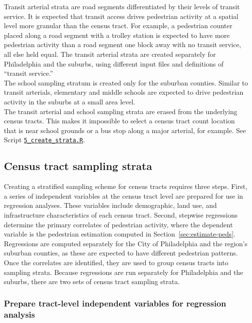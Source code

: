 \documentclass[paper=letterpaper, fontsize=11pt]{scrartcl}
\begin{document}
Transit arterial strata are road segments differentiated by their levels of transit service. It is expected that transit access drives pedestrian activity at a spatial level more granular than the census tract. For example, a pedestrian counter placed along a road segment with a trolley station is expected to have more pedestrian activity than a road segment one block away with no transit service, all else held equal. The transit arterial strata are created separately for Philadelphia and the suburbs, using different input files and definitions of ``transit service.'' \\

The school sampling stratum is created only for the suburban counties. Similar to transit arterials, elementary and middle schools are expected to drive pedestrian activity in the suburbs at a small area level. \\

The transit arterial and school sampling strata are erased from the underlying census tracts. This makes it impossible to select a census tract count location that is near school grounds or a bus stop along a major arterial, for example. See Script \href{https://github.com/addisonlarson/ped_counts/blob/master/5_create_strata.R}{\texttt{5\_create\_strata.R}}.

\subsection{Census tract sampling strata}
Creating a stratified sampling scheme for census tracts requires three steps. First, a series of independent variables at the census tract level are prepared for use in regression analyses. These variables include demographic, land use, and infrastructure characteristics of each census tract. Second, stepwise regressions determine the primary correlates of pedestrian activity, where the dependent variable is the pedestrian estimation computed in Section~\ref{sec:estimate-peds}. Regressions are computed separately for the City of Philadelphia and the region's suburban counties, as these are expected to have different pedestrian patterns. Once the correlates are identified, they are used to group census tracts into sampling strata. Because regressions are run separately for Philadelphia and the suburbs, there are two sets of census tract sampling strata.

\subsubsection{Prepare tract-level independent variables for regression analysis}
\end{document}

